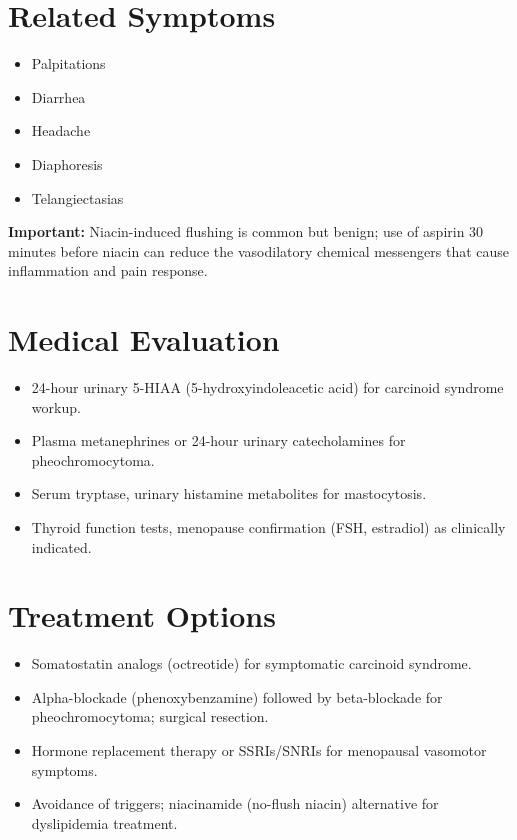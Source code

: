 \section*{Related Symptoms}
\begin{itemize}
  \item Palpitations
  \item Diarrhea
  \item Headache
  \item Diaphoresis
  \item Telangiectasias
\end{itemize}
\textbf{Important:} Niacin-induced flushing is common but benign; use of aspirin 30 minutes before niacin can reduce the vasodilatory chemical messengers that cause inflammation and pain response.

\section*{Medical Evaluation}
\begin{itemize}
  \item 24-hour urinary 5-HIAA (5-hydroxyindoleacetic acid) for carcinoid syndrome workup.
  \item Plasma metanephrines or 24-hour urinary catecholamines for pheochromocytoma.
  \item Serum tryptase, urinary histamine metabolites for mastocytosis.
  \item Thyroid function tests, menopause confirmation (FSH, estradiol) as clinically indicated.
\end{itemize}

\section*{Treatment Options}
\begin{itemize}
  \item Somatostatin analogs (octreotide) for symptomatic carcinoid syndrome.
  \item Alpha-blockade (phenoxybenzamine) followed by beta-blockade for pheochromocytoma; surgical resection.
  \item Hormone replacement therapy or SSRIs/SNRIs for menopausal vasomotor symptoms.
  \item Avoidance of triggers; niacinamide (no-flush niacin) alternative for dyslipidemia treatment.
\end{itemize}



